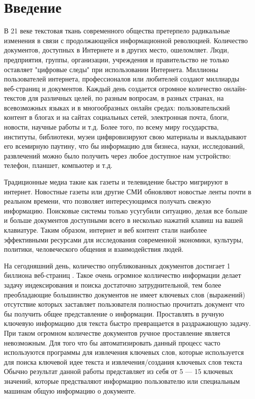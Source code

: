 \section{Введение}
В 21 веке текстовая ткань современного общества претерпело радикальные изменения в связи с продолжающейся информационной революцией.
Количество документов, доступных в Интернете и в других место, ошеломляет.
Люди, предприятия, группы, организации, учреждения и правительство не только оставляет "цифровые следы" при использовании Интернета.
Миллионы пользователей интернета, профессионалов или любителей создают миллиарды веб-страниц и документов.
Каждый день создается огромное количество онлайн-текстов для различных целей, по разным вопросам, в разных странах, на всевозможных языках и в многообразных онлайн средах: пользовательский контент в блогах и на сайтах социальных сетей, электронная почта, блоги, новости, научные работы и т.д.
Более того, по всему миру государства, институты, библиотеки, музеи цифвровизируют свою материалы и выкладывают его всемирную паутину, что бы информацию для бизнеса, науки, исследований, развлечений можно было получить через любое доступное нам устройство: телефон, планшет, компьютер и т.д. \cite{2}

Традиционные медиа такие как газеты и телевидение быстро мигрируют в интернет.
Новостные газеты или другие СМИ обновляют новостые ленты почти в реальном времени, что позволяет интересующимся получать свежую информацию.
Поисковые системы только усугубили ситуацию, делая все больше и больше документов доступными всего в несколько нажатий клавиш на вашей клавиатуре.
Таким образом, интернет и веб контент стали наиболее эффективными ресурсами для исследования современной экономики, культуры, политики, человеческого общения и взаимодействия людей. \cite{2}

На сегодняшний день, количество опубликованных документов достигает 1 биллиона веб-страниц \cite{1}. 
Такое очень огромное колличество информации делает задачу индексирования и поиска достаточно затруднительной, тем более преобладающие большинство документов не имеет ключевых слов (выражений) отсутствие которых заставляет пользователя полностью прочитать документ что бы получить общее представление о информации.
Проставлять в ручную ключевую информацию для текста быстро превращается в раздражающую задачу. 
При таком огромном количестве документов ручное проставление является невозможным. 
Для того что бы автоматизировать данный процесс часто используются программы для извлечения ключевых слов, которые используется для поиска ключевой идее текста и извлечения/создания ключевых слов текста
Обычно результат данной работы представляет из себя от 5 — 15 ключевых значений, которые предстваляют информацию пользователю или специальным машинам общую информацию о документе.

